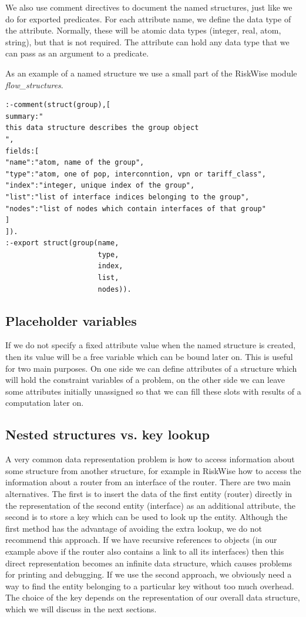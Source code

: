 \documentclass[a4paper,12pt]{report}
\begin{document}
We also use comment directives to document the named structures, just like we do for exported predicates. For each attribute name, we define the data type of the attribute. Normally, these will be atomic data types (integer, real, atom, string), but that is not required. The attribute can hold any data type that we can pass as an argument to a predicate. 

As an example of a named structure we use a small part of the RiskWise module {\it flow\_structures}. 
\begin{verbatim}
:-comment(struct(group),[
summary:"
this data structure describes the group object
",
fields:[
"name":"atom, name of the group",
"type":"atom, one of pop, interconntion, vpn or tariff_class",
"index":"integer, unique index of the group",
"list":"list of interface indices belonging to the group",
"nodes":"list of nodes which contain interfaces of that group"
]
]).
:-export struct(group(name,
                      type,
                      index,
                      list,
                      nodes)).
\end{verbatim}

\subsection{Placeholder variables}
If we do not specify a fixed attribute value when the named structure is created, then its value will be a free variable which can be bound later on. This is useful for two main purposes. On one side we can define attributes of a structure which will hold the constraint variables of a problem, on the other side we can leave some attributes initially unassigned so that we can fill these slots with results of a computation later on.

\subsection{Nested structures vs. key lookup}
A very common data representation problem is how to access information about some structure from another structure, for example in RiskWise how to access the information about a router from an interface of the router. There are two main alternatives. The first is to insert the data of the first entity (router) directly in the representation of the second entity (interface) as an additional attribute, the second is to store a key which can be used to look up the entity. Although the first method has the advantage of avoiding the extra lookup, we do not recommend this approach. If we have recursive references to objects (in our example above if the router also contains a link to all its interfaces) then this direct representation becomes an infinite data structure, which causes problems for printing and debugging. If we use the second approach, we obviously need a way to find the entity belonging to a particular key without too much overhead. The choice of the key depends on the representation of our overall data structure, which we will discuss in the next sections.
\end{document}
